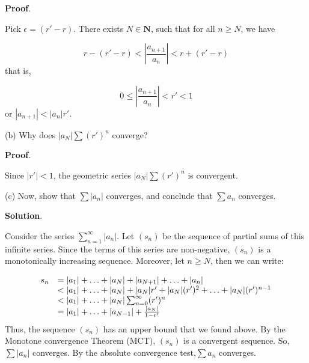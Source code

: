 \documentclass[10pt]{article}
\begin{document}
\textbf{Proof}.

Pick $\displaystyle \epsilon =( r'-r)$. There exists $\displaystyle N\in \mathbf{N}$, such that for all $\displaystyle n\geq N$, we have


\begin{equation*}
r-( r'-r) < \left| \frac{a_{n+1}}{a_{n}}\right| < r+( r'-r)
\end{equation*}
that is,


\begin{equation*}
0\leq \left| \frac{a_{n+1}}{a_{n}}\right| < r'< 1
\end{equation*}
or $\displaystyle |a_{n+1} |< |a_{n} |r'$.



(b) Why does $\displaystyle |a_{N} |\sum ( r')^{n}$ converge?



\textbf{Proof}.

Since $\displaystyle |r'|< 1$, the geometric series $\displaystyle |a_{N} |\sum ( r')^{n}$ is convergent.



(c) Now, show that $\displaystyle \sum |a_{n} |$ converges, and conclude that $\displaystyle \sum a_{n}$ converges.



\textbf{Solution}.



Consider the series $\displaystyle \sum _{n=1}^{\infty } |a_{n} |$. Let $\displaystyle ( s_{n})$ be the sequence of partial sums of this infinite series. Since the terms of this series are non-negative, $\displaystyle ( s_{n})$ is a monotonically increasing sequence. Moreover, let $\displaystyle n\geq N$, then we can write:


\begin{equation*}
\begin{array}{ c l }
s_{n} & =|a_{1} |+\dotsc +|a_{N} |+|a_{N+1} |+\dotsc +|a_{n} |\\
 & < |a_{1} |+\dotsc +|a_{N} |+|a_{N} |r'+|a_{N} |( r')^{2} +\dotsc +|a_{N} |( r')^{n-1}\\
 & < |a_{1} |+\dotsc +|a_{N} |\sum _{n=0}^{\infty }( r')^{n}\\
 & =|a_{1} |+\dotsc +|a_{N-1} |+\frac{|a_{N} |}{1-r'}
\end{array}
\end{equation*}
Thus, the sequence $\displaystyle ( s_{n})$ has an upper bound that we found above. By the Monotone convergence Theorem (MCT), $\displaystyle ( s_{n})$ is a convergent sequence. So, $\displaystyle \sum |a_{n} |$ converges. By the absolute convergence test,$\displaystyle \sum a_{n}$ converges.
\end{document}

